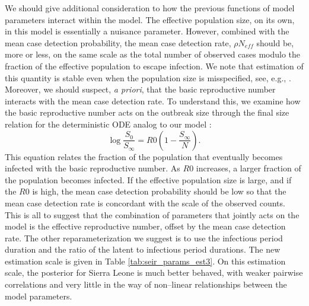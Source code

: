 We should give additional consideration to how the previous functions of model parameters interact within the model. The effective population size, on its own, in this model is essentially a nuisance parameter. However, combined with the mean case detection probability, the mean case detection rate, $ \rho N_{eff} $ should be, more or less, on the same scale as the total number of observed cases modulo the fraction of the effective population to escape infection. We note that estimation of this quantity is stable even when the population size is misspecified, see, e.g., \cite{fintzi2017efficient, koepke2016predictive}. Moreover, we should suspect, \textit{a priori}, that the basic reproductive number interacts with the mean case detection rate. To understand this, we examine how the basic reproductive number acts on the outbreak size through the final size relation for the deterministic ODE analog to our model \cite{bauer2008compartmental}: 
\begin{equation}
\label{eqn:final_size_relation}
\log\frac{S_0}{S_\infty} = R0\left (1 - \frac{S_\infty}{N}\right ).
\end{equation}
This equation relates the fraction of the population that eventually becomes infected with the basic reproductive number. As $ R0 $ increases, a larger fraction of the population becomes infected. If the effective population size is large, and if the $ R0 $ is high, the mean case detection probability should be low so that the mean case detection rate is concordant with the scale of the observed counts. This is all to suggest that the combination of parameters that jointly acts on the model is the effective reproductive number, offset by the mean case detection rate. The other reparameterization we suggest is to use the infectious period duration and the ratio of the latent to infectious period durations. The new estimation scale is given in Table \ref{tab:seir_params_est3}. On this estimation scale, the posterior for Sierra Leone is much better behaved, with weaker pairwise correlations and very little in the way of non--linear relationships between the model parameters.

